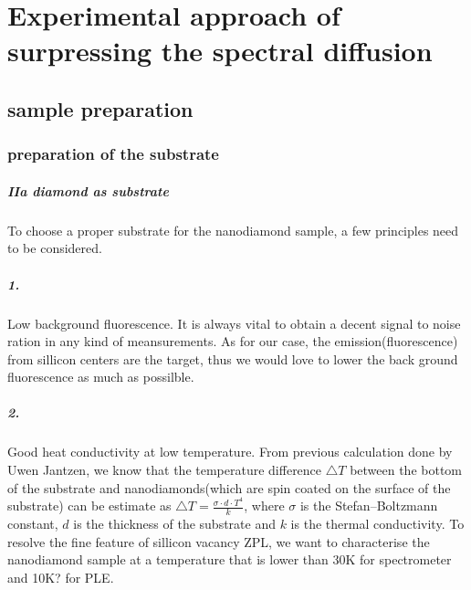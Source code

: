 \chapter[Experimental approach of surpressing the spectral diffusion]{Experimental approach of surpressing the spectral diffusion} %

\label{Chapter2} %


\section[sample preparation]{sample preparation}
\subsection{preparation of the substrate}
\paragraph{IIa diamond as substrate}

To choose a proper substrate for the nanodiamond sample, a few principles need to be considered.

\paragraph{1.}Low background fluorescence. 
It is always vital to obtain a decent signal to noise ration in any kind of meansurements. As for our case, the emission(fluorescence) from sillicon centers are the target, thus we would love to lower the back ground fluorescence as much as possilble.
\paragraph{2.}Good heat conductivity at low temperature.
From previous calculation done by Uwen Jantzen, we know that the temperature difference $\bigtriangleup T$ between the bottom of the substrate and nanodiamonds(which are spin coated on the surface of the substrate) can be estimate as\newline
$\bigtriangleup T = \frac{\sigma \cdot d \cdot T^{4}}{k} $,
where $\sigma$ is the Stefan–Boltzmann constant, $d$ is the thickness of the substrate and $k$ is the thermal conductivity.
To resolve the fine feature of sillicon vacancy ZPL, we want to characterise the nanodiamond sample at a temperature that is lower than 30K for spectrometer and 10K? for PLE.
